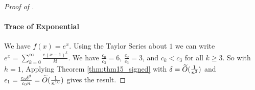 \begin{proof}[Proof of ]
    \paragraph{Trace of Exponential} We have $f(x) = e^x$. Using the Taylor Series about $1$ we can write $e^x = \sum_{k=0}^\infty \frac{e(x-1)^k}{k!}$. We have $\frac{c_0}{c_3} = 6$, $\frac{c_2}{c_3} = 3$, and $c_k < c_3$ for all $k \geq 3$. So with $h=1$, Applying Theorem \ref{thm:thm15_signed} with $\delta = \widetilde{O}( {\frac{1}{n^3}} )$ and $\epsilon_1 = \frac{c_3 \delta^3}{c_0 n} = \widetilde{O}( {\frac{1}{n^{10}}} )$ gives the result.
\end{proof}